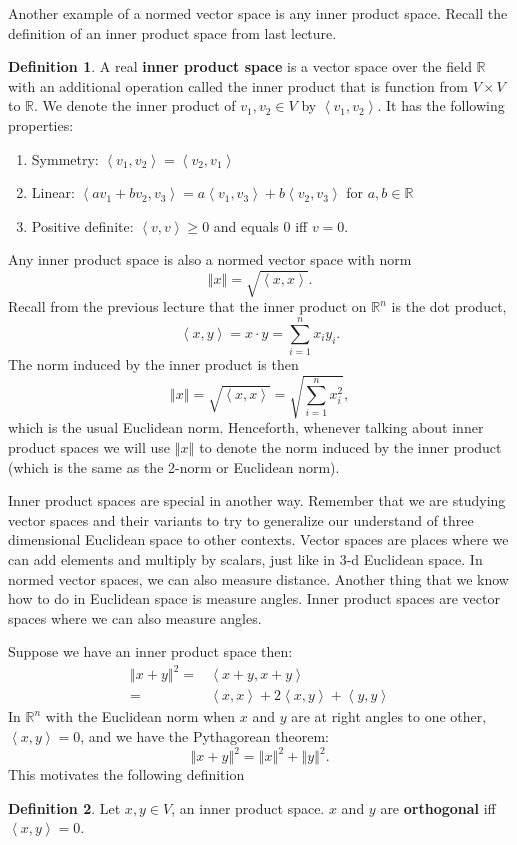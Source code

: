 \documentclass[12pt,reqno]{amsart}
\theoremstyle{definition}
\newtheorem{definition}{Definition}[section]
\def\R{\mathbb{R}}
\newcommand{\iprod}[2]{\left\langle {#1} , {#2} \right\rangle}
\newcommand{\norm}[1]{\left\Vert {#1} \right\Vert}
\begin{document}
Another example of a normed vector space is any inner product space.
Recall the definition of an inner product space from last lecture.
\begin{definition}
  A real \textbf{inner product space} is a vector space over the field
  $\R$ with an additional operation called the inner product that is
  function from $V \times V$ to $\mathbb{R}$. We denote the inner
  product of $v_1, v_2 \in V$ by $\iprod{v_1}{v_2}$. It has the
  following properties:
  \begin{enumerate}
  \item Symmetry: $\iprod{v_1}{v_2} = \iprod{v_2}{v_1}$
  \item Linear: $\iprod{a v_1 + b v_2}{v_3} = a \iprod{v_1}{v_3} + b
    \iprod{v_2}{v_3}$ for $a, b \in \R$
  \item Positive definite: $\iprod{v}{v} \geq 0$ and equals $0$ iff
    $v=0$. 
  \end{enumerate}  
\end{definition}
Any inner product space is also a normed vector space with norm
\[ \norm{x} = \sqrt{\iprod{x}{x}}. \]
Recall from the previous lecture that the inner product on $\R^n$ is
the dot product,
\[ \iprod{x}{y} = x\cdot y = \sum_{i=1}^n x_i y_i. \] 
The norm induced by the inner product is then
\[ \norm{x} = \sqrt{\iprod{x}{x}} = \sqrt{\sum_{i=1}^n x_i^2 }, \]
which is the usual Euclidean norm. Henceforth, whenever talking about
inner product spaces we will use $\norm{x}$ to denote the norm induced
by the inner product (which is the same as the 2-norm or Euclidean
norm).

Inner product spaces are special in another way. Remember that we are
studying vector spaces and their variants to try to generalize our
understand of three dimensional Euclidean space to other
contexts. Vector spaces are places where we can add elements and
multiply by scalars, just like in 3-d Euclidean space. In normed
vector spaces, we can also measure distance. Another thing that we
know how to do in Euclidean space is measure angles. Inner product
spaces are vector spaces where we can also measure angles. 

Suppose we have an inner product space then:
\begin{align*}
  \norm{x + y}^2 = & \iprod{x+y}{x+y} \\
  = & \iprod{x}{x} + 2\iprod{x}{y} + \iprod{y}{y}
\end{align*}
In $\R^n$ with the Euclidean norm when $x$ and $y$ are at right angles
to one other, $\iprod{x}{y} = 0$, and we have the Pythagorean theorem:
\[ \norm{x + y}^2 = \norm{x}^2 + \norm{y}^2. \]
This motivates the following definition
\begin{definition}
  Let $x,y \in V$, an inner product space. $x$ and $y$ are
  \textbf{orthogonal} iff $\iprod{x}{y} = 0$. 
\end{definition}
\end{document}
